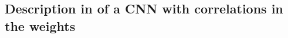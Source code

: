 {\subsection{Description in \Netsor of a CNN with correlations in the weights\label{sec:netsor-program}}




}

